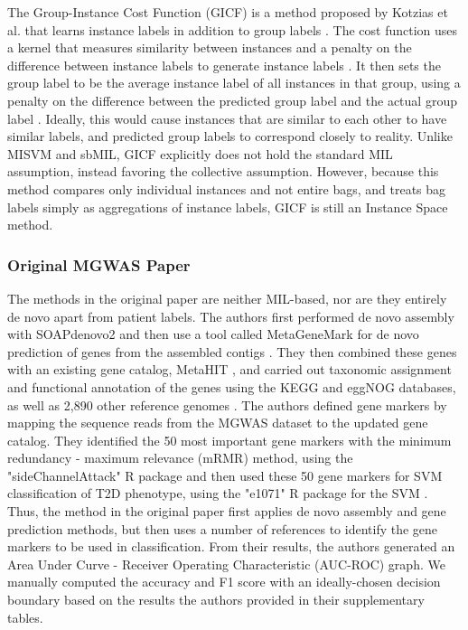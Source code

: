 The Group-Instance Cost Function (GICF) is a method proposed by Kotzias et al. that learns instance labels in addition to group labels \cite{kotzias15}. The cost function uses a kernel that measures similarity between instances and a penalty on the difference between instance labels to generate instance labels \cite{kotzias15}. It then sets the group label to be the average instance label of all instances in that group, using a penalty on the difference between the predicted group label and the actual group label \cite{kotzias15}. Ideally, this would cause instances that are similar to each other to have similar labels, and predicted group labels to correspond closely to reality. Unlike MISVM and sbMIL, GICF explicitly does not hold the standard MIL assumption, instead favoring the collective assumption. However, because this method compares only individual instances and not entire bags, and treats bag labels simply as aggregations of instance labels, GICF is still an Instance Space method.

\subsubsection{Original MGWAS Paper}

The methods in the original paper are neither MIL-based, nor are they entirely de novo apart from patient labels. The authors first performed de novo assembly with SOAPdenovo2 \cite{luo12} and then use a tool called MetaGeneMark \cite{zhu10, besemer99} for de novo prediction of genes from the assembled contigs \cite{qin041012}. They then combined these genes with an existing gene catalog, MetaHIT \cite{qin030410}, and carried out taxonomic assignment and functional annotation of the genes using the KEGG \cite{kanehisa00} and eggNOG \cite{powell12} databases, as well as 2,890 other reference genomes \cite{qin041012}. The authors defined gene markers by mapping the sequence reads from the MGWAS dataset to the updated gene catalog. They identified the 50 most important gene markers with the minimum redundancy - maximum relevance (mRMR) \cite{peng05} method, using the "sideChannelAttack" R package and then used these 50 gene markers for SVM classification of T2D phenotype, using the "e1071" R package for the SVM \cite{qin041012}. Thus, the method in the original paper first applies de novo assembly and gene prediction methods, but then uses a number of references to identify the gene markers to be used in classification. From their results, the authors generated an Area Under Curve - Receiver Operating Characteristic (AUC-ROC) graph. We manually computed the accuracy and F1 score with an ideally-chosen decision boundary based on the results the authors provided in their supplementary tables. 

